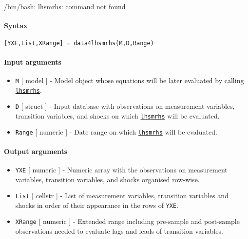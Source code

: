 /bin/bash: lhsmrhs: command not found



	\paragraph{Syntax}\label{syntax}

\begin{verbatim}
[YXE,List,XRange] = data4lhsmrhs(M,D,Range)
\end{verbatim}

\paragraph{Input arguments}\label{input-arguments}

\begin{itemize}
\item
  \texttt{M} {[} model {]} - Model object whose equations will be later
  evaluated by calling \href{model/lhsmrhs}{\texttt{lhsmrhs}}.
\item
  \texttt{D} {[} struct {]} - Input database with observations on
  measurement variables, transition variables, and shocks on which
  \href{model/lhsmrhs}{\texttt{lhsmrhs}} will be evaluated.
\item
  \texttt{Range} {[} numeric {]} - Date range on which
  \href{model/lhsmrhs}{\texttt{lhsmrhs}} will be evaluated.
\end{itemize}

\paragraph{Output arguments}\label{output-arguments}

\begin{itemize}
\item
  \texttt{YXE} {[} numeric {]} - Numeric array with the observations on
  measurement variables, transition variables, and shocks organised
  row-wise.
\item
  \texttt{List} {[} cellstr {]} - List of measurement variables,
  transition variables and shocks in order of their appearance in the
  rows of \texttt{YXE}.
\item
  \texttt{XRange} {[} numeric {]} - Extended range including pre-sample
  and post-sample observations needed to evaluate lags and leads of
  transition variables.
\end{itemize}


